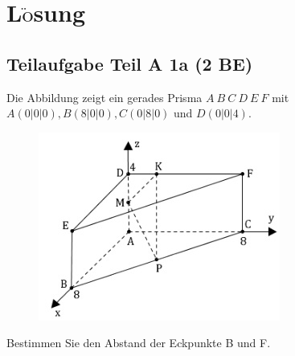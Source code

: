 \documentclass[a4 paper, 12pt]{report}
\theoremstyle{plain}
\begin{document}
\section*{L$\ddot{\mbox{o}}$sung}
\subsection*{Teilaufgabe Teil A 1a (2 BE)}
Die Abbildung zeigt ein gerades Prisma $A ~B~ C~ D~ E~ F$ mit $A(0|0|0), B(8|0|0), C(0|8|0)$ und $D(0|0|4).$
\begin{figure}[h]
	\centering
		\includegraphics{image1.jpg}
	\label{fig:image1}
\end{figure}$$$$
Bestimmen Sie den Abstand der Eckpunkte B und F.
\end{document}
